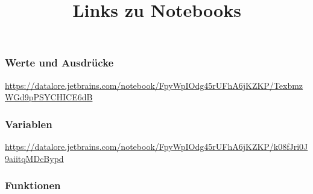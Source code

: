 \documentclass[]{scrartcl}
\title{Links zu Notebooks}
\begin{document}
	
\subsubsection*{Werte und Ausdrücke}

\url{https://datalore.jetbrains.com/notebook/FpyWpIOdg45rUFhA6jKZKP/TexbmzWGd9pPSYCHICE6dB}
	
\subsubsection*{Variablen}

\url{https://datalore.jetbrains.com/notebook/FpyWpIOdg45rUFhA6jKZKP/k08fJri0J9aiitqMDcBypd}
\subsubsection*{Funktionen}
\end{document}
